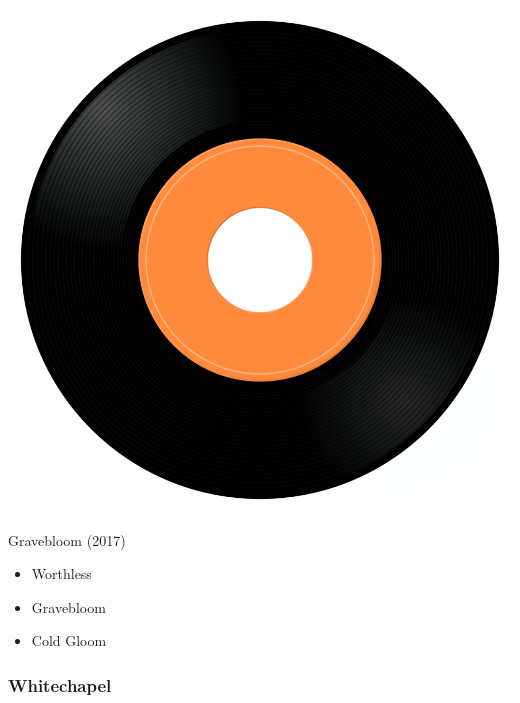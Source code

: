 \begin{minipage}[t]{0.25\textwidth}\vspace{0pt}
\captionsetup{type=figure}
\includegraphics[width=\textwidth]{Images/cover.png}
\caption*{Gravebloom (2017)}
\end{minipage}
\begin{minipage}[t]{0.25\textwidth}\vspace{0pt}
\begin{itemize}[nosep,leftmargin=1em,labelwidth=*,align=left]
	\setlength{\itemsep}{0pt}
	\item Worthless
	\item Gravebloom
	\item Cold Gloom
\end{itemize}
\end{minipage}

\subsubsection{Whitechapel}

